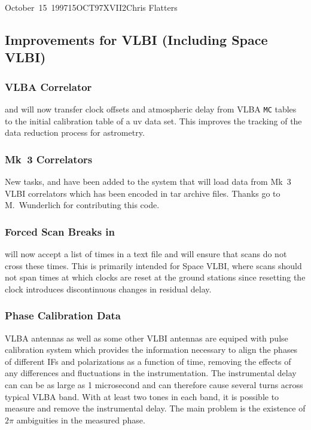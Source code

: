 \documentclass[twoside]{article}
\begin{document}
\begin{aipsletter}{October~15~1997}{15OCT97}{XVII}{2}{Chris Flatters}
\subsection{Improvements for VLBI (Including Space VLBI)}

\subsubsection{VLBA Correlator}

 and  will now transfer clock offsets and
atmospheric delay from VLBA \texttt{MC} tables to the initial
calibration table of a uv data set.  This improves the tracking of the
data reduction process for astrometry.

\subsubsection{Mk~3 Correlators}

New tasks,  and  have been added to the system
that will load data from Mk~3 VLBI correlators which has been encoded
in tar archive files.  Thanks go to M.~Wunderlich for contributing
this code.

\subsubsection{Forced Scan Breaks in }

 will now accept a list of times in a text file and will
ensure that scans do not cross these times.  This is primarily
intended for Space VLBI, where scans should not span times at which
clocks are reset at the ground stations since resetting the clock
introduces discontinuous changes in residual delay.

\subsubsection{Phase Calibration Data}

VLBA antennas as well as some other VLBI antennas are equiped with
pulse calibration system which provides the information necessary to
align the phases of different IFs and polarizations as a function of
time, removing the effects of any differences and fluctuations in the
instrumentation. The instrumental delay can can be as large as 1
microsecond and can therefore cause several turns across typical VLBA
band. With at least two tones in each band, it is possible to measure
and remove the instrumental delay. The main problem is the existence
of $2\pi$ ambiguities in the measured phase.


\end{aipsletter}
\end{document}
